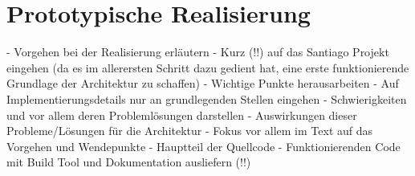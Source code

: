 \chapter{Prototypische Realisierung} %
\label{cha:prototypische_realisierung}

- Vorgehen bei der Realisierung erläutern
- Kurz (!!) auf das Santiago Projekt eingehen (da es im allerersten Schritt dazu gedient hat, eine erste funktionierende Grundlage der Architektur zu schaffen)
- Wichtige Punkte herausarbeiten
- Auf Implementierungsdetails nur an grundlegenden Stellen eingehen
- Schwierigkeiten und vor allem deren Problemlösungen darstellen
- Auswirkungen dieser Probleme/Lösungen für die Architektur
- Fokus vor allem im Text auf das Vorgehen und Wendepunkte
- Hauptteil der Quellcode
- Funktionierenden Code mit Build Tool und Dokumentation ausliefern (!!)

